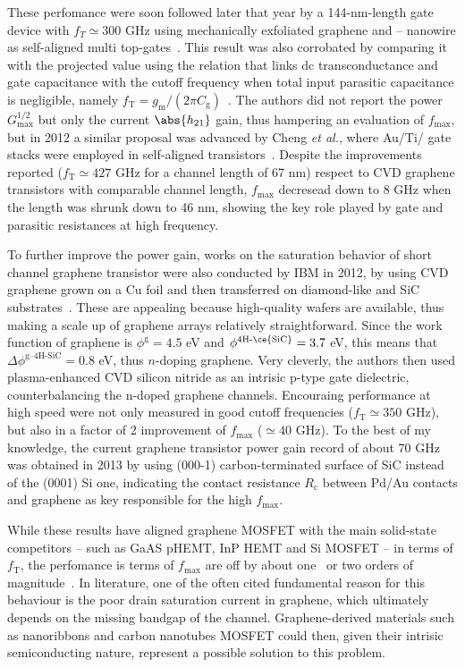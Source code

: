 These perfomance were soon followed later that year by a 144-nm-length gate device with $f_T \simeq 300$ GHz using mechanically exfoliated graphene and – nanowire as self-aligned multi top-gates~\cite{liao2010high}. This result was also corrobated by comparing it with the projected
value using the relation that links dc transconductance and gate capacitance with the cutoff frequency when total input parasitic capacitance is negligible, namely $f_\textrm{T} = g_\textrm{m}/(2\pi C_\textrm{g})$~\cite{sze2021physics}. The authors did not report the power $G^{1/2}_\textrm{max}$ but only the current $\abs{h_{21}}$ gain, thus hampering an evaluation of $f_\textrm{max}$,
but in 2012 a similar proposal was advanced by Cheng \textit{et al.}, where Au/Ti/ gate stacks were employed in self-aligned transistors~\cite{cheng2012high}. Despite the improvements reported ($f_\textrm{T}\simeq 427$ GHz for a channel length of 67 nm) respect to CVD graphene transistors with comparable channel length, $f_\textrm{max}$ decresead down to 8 GHz when the length was shrunk down to 46 nm, showing the
key role played by gate and parasitic resistances at high frequency.

To further improve the power gain, works on the saturation behavior of short channel graphene transistor were also conducted by IBM in 2012, by using CVD graphene grown on a Cu foil and then transferred on diamond-like and SiC substrates~\cite{wu2012state}. These are appealing because high-quality
wafers are available, thus making a scale up of graphene arrays relatively straightforward. Since the work function of graphene is $\phi^\textrm{g} = 4.5$ eV and $\phi^\textrm{4H-\ce{SiC}} = 3.7$ eV, this means that $\Delta\phi^\textrm{g--4H-SiC} = 0.8$ eV, thus $n$-doping graphene.
Very cleverly, the authors then used plasma-enhanced CVD silicon nitride as an intrisic p-type gate dielectric, counterbalancing the n-doped graphene channels. Encouraing performance at high speed were not only measured in good cutoff frequencies ($f_\textrm{T}\simeq 350$ GHz), but also in a factor of 2 improvement
of $f_\textrm{max}$ ($\simeq 40$ GHz).
To the best of my knowledge, the current graphene transistor power gain record of about 70 GHz was obtained in 2013 by using (000-1) carbon-terminated surface of SiC instead of the (0001) Si one, indicating the contact resistance $R_\textrm{c}$ between Pd/Au contacts and graphene as key responsible for the high $f_\textrm{max}$.

While these results have aligned graphene MOSFET with the main solid-state competitors -- such as GaAS pHEMT, InP HEMT and Si MOSFET -- in terms of $f_\textrm{T}$, the perfomance is terms of $f_\textrm{max}$ are off by about one~\cite{tan1990InGaAs, post2006RF} or two orders of magnitude~\cite{lai2007sub}. In literature, one of the often cited fundamental reason
for this behaviour is the poor drain saturation current in graphene, which ultimately depends on the missing bandgap of the channel. Graphene-derived materials such as nanoribbons and carbon nanotubes MOSFET could then, given their intrisic semiconducting nature, represent a possible solution to this problem.



